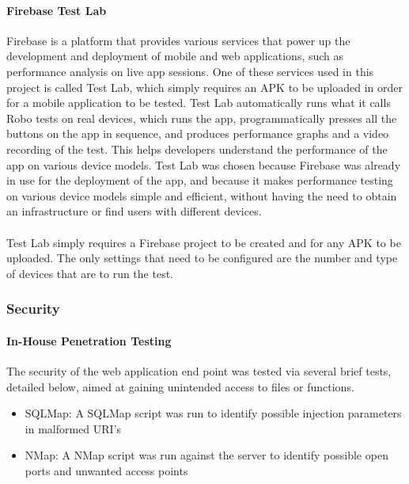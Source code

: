 \documentclass[a4paper, 11pt]{article}
\begin{document}
            \paragraph{Firebase Test Lab}
            Firebase is a platform that provides various services that power up the development and deployment of mobile and web applications, such as performance analysis on live app sessions. One of these services used in this project is called Test Lab, which simply requires an APK to be uploaded in order for a mobile application to be tested. Test Lab automatically runs what it calls Robo tests on real devices, which runs the app, programmatically presses all the buttons on the app in sequence, and produces performance graphs and a video recording of the test. This helps developers understand the performance of the app on various device models. Test Lab was chosen because Firebase was already in use for the deployment of the app, and because it makes performance testing on various device models simple and efficient, without having the need to obtain an infrastructure or find users with different devices.
            \paragraph{}
            Test Lab simply requires a Firebase project to be created and for any APK to be uploaded. The only settings that need to be configured are the number and type of devices that are to run the test.

         \subsubsection{Security}
            \paragraph{In-House Penetration Testing}
            The security of the web application end point was tested via several brief tests, detailed below, aimed at gaining unintended access to files or functions.
            \begin{itemize}
                \item SQLMap: A SQLMap script was run to identify possible injection parameters in malformed URI's
                \item NMap: A NMap script was run against the server to identify possible open ports and unwanted access points
            \end{itemize}
            
\end{document}
